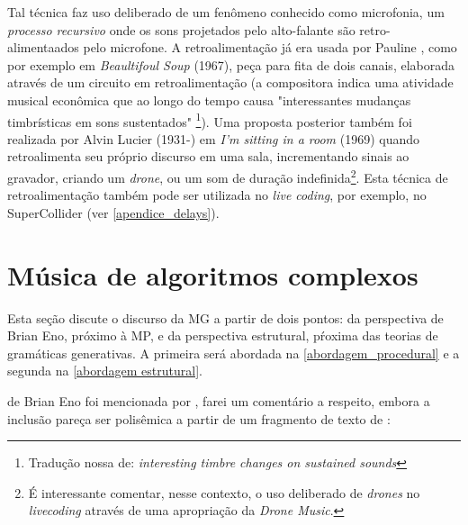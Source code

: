 Tal técnica faz uso deliberado de um fenômeno conhecido como microfonia, um \emph{processo recursivo} onde os sons projetados pelo alto-falante são retro-alimentaados pelo microfone. A retroalimentação já era usada por Pauline , como por exemplo em \emph{Beaultifoul Soup} (1967), peça para fita de dois canais, elaborada através de um circuito em retroalimentação (a compositora indica uma atividade musical econômica que ao longo do tempo causa "interessantes mudanças timbrísticas em sons sustentados" \footnote{ Tradução nossa de: \emph{interesting timbre changes on sustained sounds}}). Uma proposta posterior também foi realizada por Alvin Lucier (1931-) em \emph{I'm sitting in a room} (1969) quando retroalimenta seu próprio discurso em uma sala, incrementando sinais ao gravador, criando um \emph{drone}, ou um som de duração indefinida\footnote{É interessante comentar, nesse contexto, o uso deliberado de \emph{drones} no \emph{livecoding} através de uma apropriação da \emph{Drone Music}.}. Esta técnica de retroalimentação também pode ser utilizada no \emph{live coding}, por exemplo, no SuperCollider (ver \autoref{apendice_delays}).

\section{Música de algoritmos complexos}\label{sec:alg_complexo}

Esta seção discute o discurso da MG a partir de dois pontos: da perspectiva de Brian Eno, próximo à MP, e da perspectiva estrutural, pŕoxima das teorias de gramáticas generativas. A primeira será abordada na \autoref{abordagem_procedural} e a segunda na \autoref{abordagem estrutural}.
 
de Brian Eno foi mencionada por , farei um comentário a respeito, embora a inclusão pareça ser polisêmica a partir de um fragmento de texto de :

